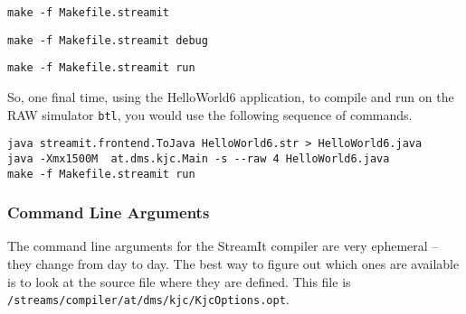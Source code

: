 \begin{verbatim}
make -f Makefile.streamit
\end{verbatim}

\begin{verbatim}
make -f Makefile.streamit debug
\end{verbatim}

\begin{verbatim}
make -f Makefile.streamit run
\end{verbatim}


So, one final time, using the HelloWorld6 application,
to compile and run on the RAW simulator {\tt btl}, 
you would use the following sequence of commands.

\begin{verbatim}
java streamit.frontend.ToJava HelloWorld6.str > HelloWorld6.java
java -Xmx1500M  at.dms.kjc.Main -s --raw 4 HelloWorld6.java
make -f Makefile.streamit run
\end{verbatim}


\subsubsection{Command Line Arguments}
The command line arguments for the StreamIt compiler are
very ephemeral -- they change from day to day. The best way 
to figure out which ones are available is to look at the
source file where they are defined. This file is
{\tt /streams/compiler/at/dms/kjc/KjcOptions.opt}.